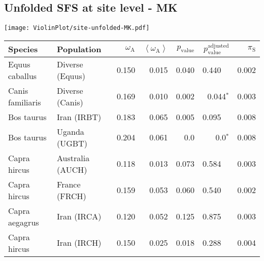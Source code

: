 \subsection{Unfolded SFS at site level - MK} 
\begin{center}
\texttt{[image: ViolinPlot/site-unfolded-MK.pdf]} 
\begin{adjustbox}{width = 1\textwidth}
\begin{tabular}{|l|l|r|r|r|r|r|}
\toprule
             Species &                      Population & $\omega_{\mathrm{A}}$ & $\left< \omega_{\mathrm{A}} \right>$ & $p_{\mathrm{value}}$ & $p_{\mathrm{value}}^{\mathrm{adjusted}}$ & $\pi_{\textrm{S}}$ \\
\midrule
      Equus caballus &                 Diverse (Equus) &                 0.150 &                                0.015 &                0.040 &                                  0.440~~ &              0.002 \\
    Canis familiaris &                 Diverse (Canis) &                 0.169 &                                0.010 &                0.002 &                           0.044$\bm{^*}$ &              0.003 \\
          Bos taurus &                     Iran (IRBT) &                 0.183 &                                0.065 &                0.005 &                                  0.095~~ &              0.008 \\
          Bos taurus &                   Uganda (UGBT) &                 0.204 &                                0.061 &                  0.0 &                             0.0$\bm{^*}$ &              0.008 \\
        Capra hircus &                Australia (AUCH) &                 0.118 &                                0.013 &                0.073 &                                  0.584~~ &              0.003 \\
        Capra hircus &                   France (FRCH) &                 0.159 &                                0.053 &                0.060 &                                  0.540~~ &              0.002 \\
      Capra aegagrus &                     Iran (IRCA) &                 0.120 &                                0.052 &                0.125 &                                  0.875~~ &              0.003 \\
        Capra hircus &                     Iran (IRCH) &                 0.150 &                                0.025 &                0.018 &                                  0.288~~ &              0.004 \\

\end{tabular}
\end{adjustbox}
\end{center}
